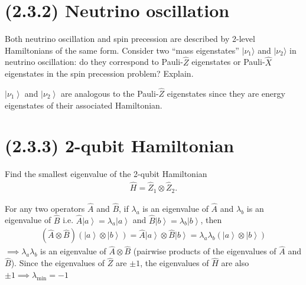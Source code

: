 \documentclass[11pt, answers]{exam}
\newcommand{\ket}[1]{\left\lvert {#1}\right\rangle}
\begin{document}
	\section*{(2.3.2) Neutrino oscillation}
	
	Both neutrino oscillation and spin precession are described by 2-level Hamiltonians of the same form. Consider two ``mass eigenstates'' $|\nu_1\rangle$ and $|\nu_2\rangle$ in neutrino oscillation: do they correspond to Pauli-$\hat{Z}$ eigenstates or Pauli-$\hat{X}$ eigenstates in the spin precession problem? Explain.
	
	\begin{solution}
		$\ket{\nu_1}$ and $\ket{\nu_2}$ are analogous to the Pauli-$\hat{Z}$ eigenstates since they are energy eigenstates of their associated Hamiltonian.
	\end{solution}
	
	\section*{(2.3.3) 2-qubit Hamiltonian}
	
	Find the smallest eigenvalue of the 2-qubit Hamiltonian
	\begin{align*}
		\hat{H} = \hat{Z}_1 \otimes \hat{Z}_2.
	\end{align*}
	
	\begin{solution}
		For any two operators $\hat{A}$ and $\hat{B}$, if $\lambda_a$ is an eigenvalue of $\hat{A}$ and $\lambda_b$ is an eigenvalue of $\hat{B}$ i.e. $\hat{A}\ket{a}=\lambda_a\ket{a}$ and $\hat{B}\ket{b}=\lambda_b\ket{b}$, then
		\begin{align*}
			(\hat{A}\otimes\hat{B})(\ket{a}\otimes\ket{b})= \hat{A}\ket{a} \otimes \hat{B}\ket{b}=\lambda_a\lambda_b(\ket{a}\otimes\ket{b})
		\end{align*}
		$\implies \lambda_a\lambda_b$ is an eigenvalue of $\hat{A}\otimes\hat{B}$ (pairwise products of the eigenvalues of $\hat{A}$ and $\hat{B}$). Since the eigenvalues of $\hat{Z}$ are $\pm 1$, the eigenvalues of $\hat{H}$ are also $\pm 1 \implies \lambda_{\text{min}}=-1$
	\end{solution}
\end{document}
